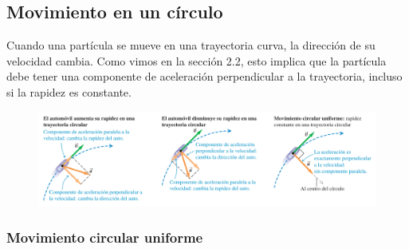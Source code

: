 \documentclass{article}
\newcommand{\newsubsection}[1]{
    \vspace{0.5cm}
    \color{sectionColor}
    \subsection{\bl{#1}}
    \color{black}
    \vspace{0.5cm}
}
\newcommand{\newtitle}[1]{
    \color{titleColor}
    \subsubsection{#1}
    \color{black}
}
\newcommand{\bl}[1]{\textbf{#1}}
\begin{document}
    \newsubsection{Movimiento en un círculo}

    \par Cuando una partícula se mueve en una trayectoria curva, la dirección de su velocidad cambia. Como vimos en la sección 2.2, esto implica que la partícula debe tener una componente de aceleración perpendicular a la trayectoria, incluso si la rapidez es constante.

    \begin{figure}[H]
        \centering
        \includegraphics[width=\textwidth]{img/2.4-10.png}
    \end{figure}

    \newtitle{Movimiento circular uniforme}
\end{document}
